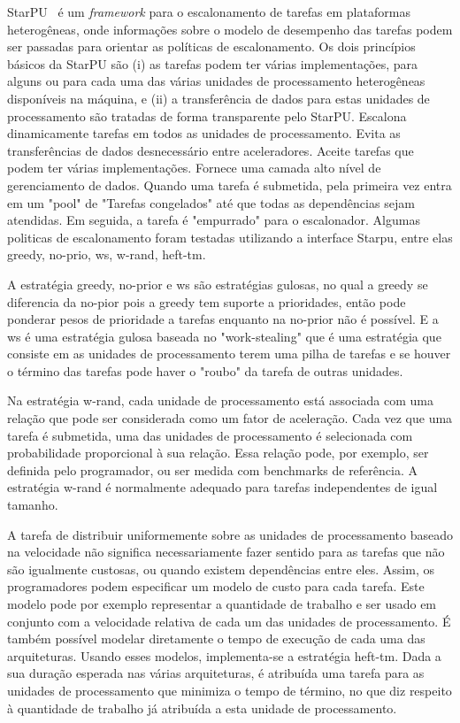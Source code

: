 StarPU~\citep{starpu} é um \textit{framework} para o escalonamento de tarefas em
plataformas heterogêneas, onde informações sobre o modelo de desempenho das
tarefas podem ser passadas para orientar as políticas de escalonamento. Os dois
princípios básicos da StarPU são (i) as tarefas podem ter várias implementações,
para alguns ou para cada uma das várias unidades de processamento heterogêneas
disponíveis na máquina, e (ii) a transferência de dados para estas unidades de
processamento são tratadas de forma transparente pelo StarPU. Escalona dinamicamente
tarefas em todos as unidades de processamento. Evita as transferências de dados  desnecessário entre aceleradores. Aceite tarefas que podem ter várias implementações. Fornece uma camada alto nível de gerenciamento de dados. Quando uma tarefa é submetida, pela primeira vez entra em um "pool" de "Tarefas congelados" até que todas as dependências sejam atendidas. Em seguida, a tarefa é "empurrado" para o escalonador. Algumas politicas de escalonamento foram testadas utilizando a interface Starpu, entre elas greedy, no-prio, ws, w-rand, heft-tm. 

A estratégia greedy, no-prior e ws são estratégias gulosas, no qual  a greedy se diferencia da no-pior pois a greedy tem suporte a prioridades, então pode ponderar pesos de prioridade a tarefas enquanto na no-prior não é possível. E a ws é uma estratégia gulosa baseada no "work-stealing" que é uma estratégia que consiste em as unidades de processamento terem uma pilha de tarefas e se houver o término das tarefas pode haver o "roubo" da tarefa de outras unidades. 

Na estratégia w-rand, cada unidade de processamento está associada com uma relação que pode ser considerada como um fator de aceleração. Cada vez que uma tarefa é submetida, uma das unidades de processamento é selecionada com probabilidade proporcional à sua relação. Essa relação pode, por exemplo, ser definida pelo programador, ou ser medida com benchmarks de referência. A estratégia w-rand é normalmente adequado para tarefas independentes de igual tamanho.

A tarefa de distribuir uniformemente sobre as unidades de processamento baseado na velocidade não significa necessariamente fazer sentido para as tarefas que não são igualmente custosas, ou quando existem dependências entre eles. Assim, os programadores podem especificar um modelo de custo para cada tarefa. Este modelo pode por exemplo representar a quantidade de trabalho e ser usado em conjunto com a velocidade relativa de cada um das unidades de processamento. É também possível modelar diretamente o tempo de execução de cada uma das arquiteturas. Usando esses modelos, implementa-se a estratégia heft-tm. Dada a sua duração esperada nas várias arquiteturas, é atribuída uma tarefa para as unidades de processamento que minimiza o tempo de término, no que diz respeito à quantidade de trabalho já atribuída a esta unidade de processamento.

